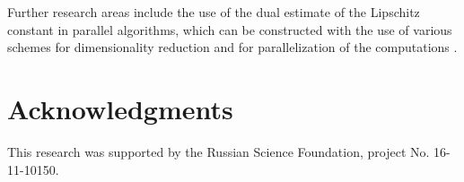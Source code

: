 \documentclass[review]{elsarticle}
\begin{document}
	Further research areas include the use of the dual estimate of the Lipschitz constant in parallel algorithms, which can be constructed with the use of various schemes for  dimensionality reduction and  for parallelization of the computations \cite{Strongin2018}. 



\section*{Acknowledgments}
This research was supported by the Russian Science Foundation, project No. 16-11-10150.


\end{document}
